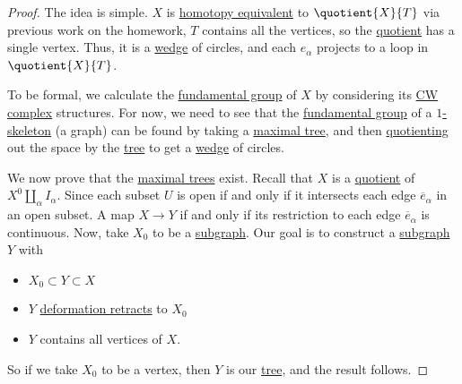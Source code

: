 \begin{proof}
	The idea is simple. \(X\) is \hyperref[def:homotopy-equivalence]{homotopy equivalent} to \(\quotient{X}{T}\) via previous work on the homework,
	\(T\) contains all the vertices, so the \hyperref[CW-complex-quotient]{quotient} has a single vertex. Thus, it is a
	\hyperref[CW-complex-wedge-sum]{wedge} of circles, and each \(e_\alpha \) projects to a loop in \(\quotient{X}{T} \).
	\begin{figure}[H]
		\centering
		\label{fig:pf:lec12-1}
	\end{figure}

	To be formal, we calculate the \hyperref[def:fundamental-group]{fundamental group} of \(X\) by considering its \hyperref[def:CW-Complex]{CW complex} structures.
	For now, we need to see that the \hyperref[def:fundamental-group]{fundamental group} of a \hyperref[def:skeleton]{\(1\)-skeleton} (a graph) can be found by taking
	a \hyperref[def:maximal-tree]{maximal tree}, and then \hyperref[CW-complex-quotient]{quotienting} out the space by the \hyperref[def:tree]{tree}
	to get a \hyperref[CW-complex-wedge-sum]{wedge} of circles.
	\begin{figure}[H]
		\centering
		\label{fig:pf:lec12-2}
	\end{figure}

	\par We now prove that the \hyperref[def:maximal-tree]{maximal trees} exist. Recall that \(X\) is a \hyperref[CW-complex-quotient]{quotient} of
	\(X^0\coprod_\alpha I_\alpha\). Since each subset \(U\) is open if and only if it intersects each edge \(\overline{e} _\alpha \) in an open subset.
	A map \(X\to Y\) if and only if its restriction to each edge \(\overline{e} _\alpha \) is continuous. Now, take \(X_0\) to be a \hyperref[def:subgraph]{subgraph}.
	Our goal is to construct a \hyperref[def:subgraph]{subgraph} \(Y\) with
	\begin{itemize}
		\item \(X_0 \subset Y\subset X\)
		\item \(Y\) \hyperref[def:deformation-retraction]{deformation retracts} to \(X_0\)
		\item \(Y\) contains all vertices of \(X\).
	\end{itemize}

	So if we take \(X_0\) to be a vertex, then \(Y\) is our \hyperref[def:tree]{tree}, and the result follows.


\end{proof}

